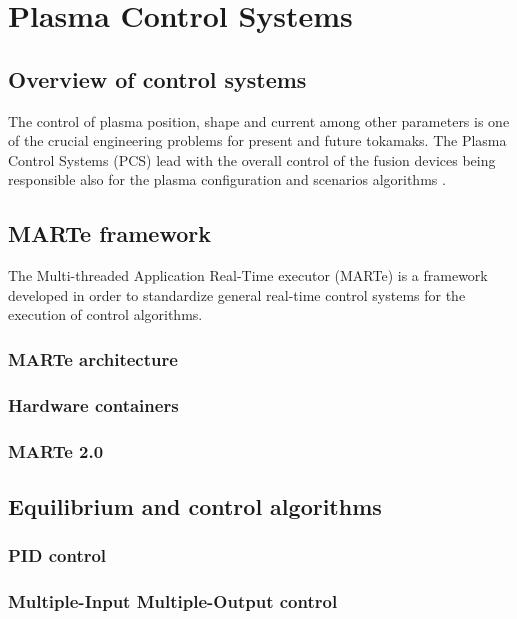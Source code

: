 \chapter{Plasma Control Systems}

\section{Overview of control systems}
The control of  plasma position, shape and current among other parameters is one of the crucial engineering problems for present and future tokamaks. The Plasma Control Systems (PCS) lead with the overall control of the fusion devices  being responsible also for the  plasma configuration and scenarios algorithms \cite[Chapter~8]{PCS_2018}. 
\hfil


\section{MARTe framework}

The Multi-threaded Application Real-Time executor (MARTe) is a framework developed in order to standardize general real-time control systems for the execution of control algorithms. \cite{Neto2011} 

\subsection{MARTe architecture }
\subsection{Hardware containers}
\subsection{MARTe 2.0}
\section{Equilibrium and control algorithms} 
\subsection{PID control}
\subsection{Multiple-Input Multiple-Output control}